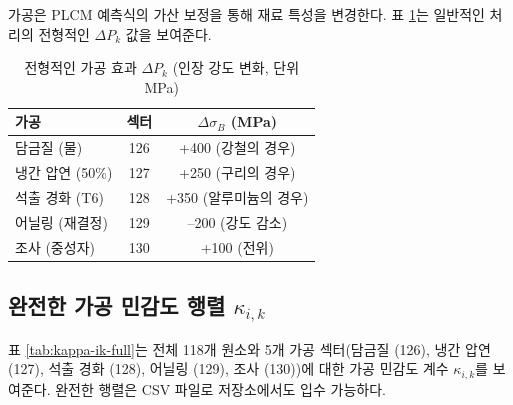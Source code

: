 \documentclass[12pt,a4paper]{article}
\begin{document}
	가공은 PLCM 예측식의 가산 보정을 통해 재료 특성을 변경한다. 표 \ref{tab:processing-effects}는 일반적인 처리의 전형적인 \(\Delta P_k\) 값을 보여준다.
	
	\begin{table}[htbp]
		\centering
		\caption{전형적인 가공 효과 \(\Delta P_k\) (인장 강도 변화, 단위 MPa)}
		\label{tab:processing-effects}
		\begin{tabular}{lcc}
			\toprule
			가공 & 섹터 & \(\Delta \sigma_B\) (MPa) \\
			\midrule
			담금질 (물) & 126 & +400 (강철의 경우) \\
			냉간 압연 (50\%) & 127 & +250 (구리의 경우) \\
			석출 경화 (T6) & 128 & +350 (알루미늄의 경우) \\
			어닐링 (재결정) & 129 & –200 (강도 감소) \\
			조사 (중성자) & 130 & +100 (전위) \\
			\bottomrule
		\end{tabular}
	\end{table}
	
	\subsection{완전한 가공 민감도 행렬 \(\kappa_{i,k}\)}
	\label{subsec:full-kappa-ik}
	
	표 \ref{tab:kappa-ik-full}는 전체 118개 원소와 5개 가공 섹터(담금질 (126), 냉간 압연 (127), 석출 경화 (128), 어닐링 (129), 조사 (130))에 대한 가공 민감도 계수 \(\kappa_{i,k}\)를 보여준다. 완전한 행렬은 CSV 파일로 저장소에서도 입수 가능하다.
	
\end{document}
